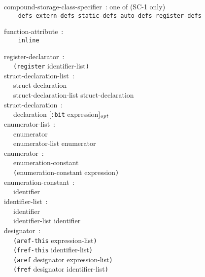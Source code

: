 \documentclass[a4]{article}
\def\|{\verb|} %|
\newcommand{\opt}{$_{{\it opt}}$}
\newcommand{\scoo}{{\rm \hfill (SC-1 only)}}
\begin{document}
\noindent
compound-storage-class-specifier{\rm \ :} {\rm one of} \scoo \\ \tt
\|  | defs extern-defs static-defs auto-defs register-defs \\ \it

\noindent
function-attribute{\rm \ :} \\ \tt
\|  | inline \\ \it


\noindent
register-declarator{\rm \ :} \\
\|  | {\tt (register} identifier-list{\tt )} \\

\noindent
struct-declaration-list{\rm \ :} \\
\|  | struct-declaration \\
\|  | struct-declaration-list struct-declaration \\


\noindent
struct-declaration{\rm \ :} \\
\|  | declaration {\rm [}{\tt :bit} expression{\rm ]}\opt \\

\noindent
enumerator-list{\rm \ :} \\
\|  | enumerator \\
\|  | enumerator-list enumerator \\

\noindent
enumerator{\rm \ :} \\
\|  | enumeration-constant \\
\|  | {\tt (}enumeration-constant expression{\tt )}\\

\noindent
enumeration-constant{\rm \ :} \\
\|  | identifier \\

\noindent
identifier-list{\rm \ :} \\
\|  | identifier \\
\|  | identifier-list identifier \\

\noindent
designator{\rm \ :} \\
\|  | {\tt (aref-this} expression-list{\tt )} \\
\|  | {\tt (fref-this} identifier-list{\tt )} \\
\|  | {\tt (aref} designator expression-list{\tt )} \\
\|  | {\tt (fref} designator identifier-list{\tt )} \\
\end{document}
